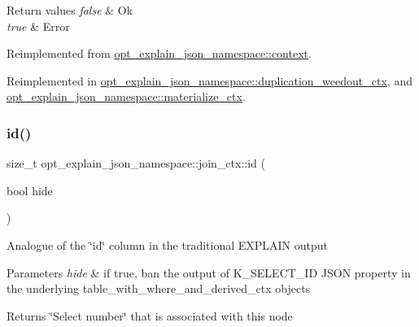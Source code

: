 \begin{DoxyRetVals}{Return values}
{\em false} & Ok \\
\hline
{\em true} & Error \\
\hline
\end{DoxyRetVals}


Reimplemented from \mbox{\hyperlink{classopt__explain__json__namespace_1_1context_ab1aae5d8b971fc1fd381c68f592b0838}{opt\+\_\+explain\+\_\+json\+\_\+namespace\+::context}}.



Reimplemented in \mbox{\hyperlink{classopt__explain__json__namespace_1_1duplication__weedout__ctx_af29378c61f70c4fc201f6b81d9f0129c}{opt\+\_\+explain\+\_\+json\+\_\+namespace\+::duplication\+\_\+weedout\+\_\+ctx}}, and \mbox{\hyperlink{classopt__explain__json__namespace_1_1materialize__ctx_a39fa8eaa0f3b84b0f18d4d0fac41a50c}{opt\+\_\+explain\+\_\+json\+\_\+namespace\+::materialize\+\_\+ctx}}.

\mbox{\label{classopt__explain__json__namespace_1_1join__ctx_ab5a53a0661e15a3cfca73c0209038945}} 
\subsubsection{\texorpdfstring{id()}{id()}}
{\footnotesize\ttfamily size\+\_\+t opt\+\_\+explain\+\_\+json\+\_\+namespace\+::join\+\_\+ctx\+::id (\begin{DoxyParamCaption}\item[{bool}]{hide }\end{DoxyParamCaption})\hspace{0.3cm}{\ttfamily [virtual]}}

Analogue of the \char`\"{}id\char`\"{} column in the traditional E\+X\+P\+L\+A\+IN output


\begin{DoxyParams}{Parameters}
{\em hide} & if true, ban the output of K\+\_\+\+S\+E\+L\+E\+C\+T\+\_\+\+ID J\+S\+ON property in the underlying table\+\_\+with\+\_\+where\+\_\+and\+\_\+derived\+\_\+ctx objects\\
\hline
\end{DoxyParams}
\begin{DoxyReturn}{Returns}
\char`\"{}\+Select number\char`\"{} that is associated with this node 
\end{DoxyReturn}



